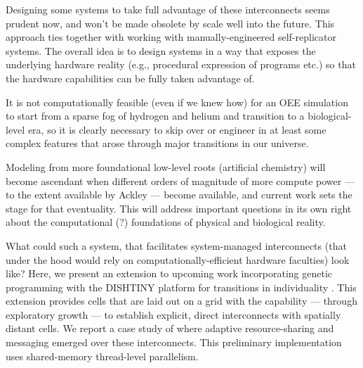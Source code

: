 Designing some systems to take full advantage of these interconnects seems prudent now, and won't be made obsolete by scale well into the future.
This approach ties together with working with manually-engineered self-replicator systems.
The overall idea is to design systems in a way that exposes the underlying hardware reality (e.g., procedural expression of programs etc.) so that the hardware capabilities can be fully taken advantage of.

\begin{displayquote}
It is not computationally feasible (even if we knew how) for an OEE simulation to start from a sparse fog of hydrogen and helium and transition to a biological-level era, so it is clearly necessary to skip over or engineer in at least some complex features that arose through major transitions in our universe. \citep{channon2019maximum}
\end{displayquote}

Modeling from more foundational low-level roots (artificial chemistry) will become ascendant when different orders of magnitude of more compute power --- to the extent available by Ackley --- become available, and current work sets the stage for that eventuality. \citep{ackley2018alife}
This will address important questions in its own right about the computational (?) foundations of physical and biological reality.

What could such a system, that facilitates system-managed interconnects (that under the hood  would rely on computationally-efficient hardware faculties) look like?
Here, we present an extension to upcoming work incorporating genetic programming with the DISHTINY platform for transitions in individuality \citep{moreno2019toward}.
This extension provides cells that are laid out on a grid with the capability --- through exploratory growth --- to establish explicit, direct interconnects with spatially distant cells.
We report a case study of where adaptive resource-sharing and messaging emerged over these interconnects.
This preliminary implementation uses shared-memory thread-level parallelism.
